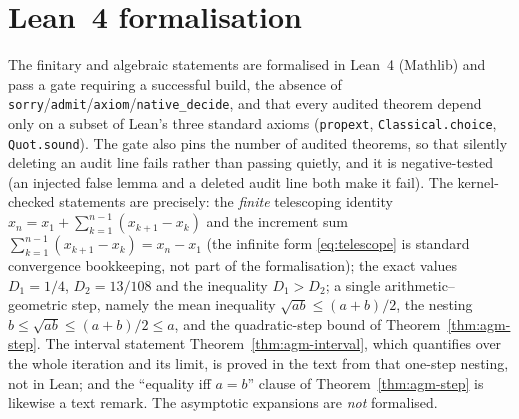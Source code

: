 \documentclass[11pt]{article}
\theoremstyle{plain}
\theoremstyle{remark}
\begin{document}
\section{Lean~4 formalisation}
\label{app:lean}
The finitary and algebraic statements are formalised in Lean~4 (Mathlib) and
pass a gate requiring a successful build, the absence of
\texttt{sorry}/\texttt{admit}/\texttt{axiom}/\texttt{native\_decide}, and that
every audited theorem depend only on a subset of Lean's three standard axioms
(\texttt{propext}, \texttt{Classical.choice}, \texttt{Quot.sound}). The gate
also pins the number of audited theorems, so that silently deleting an audit
line fails rather than passing quietly, and it is negative-tested (an injected
false lemma and a deleted audit line both make it fail). The kernel-checked
statements are precisely: the \emph{finite} telescoping identity
$x_n = x_1 + \sum_{k=1}^{n-1}(x_{k+1}-x_k)$ and the increment sum
$\sum_{k=1}^{n-1}(x_{k+1}-x_k) = x_n - x_1$ (the infinite form
\eqref{eq:telescope} is standard convergence bookkeeping, not part of the
formalisation); the exact values $D_1 = 1/4$, $D_2 = 13/108$ and the inequality
$D_1 > D_2$; a single arithmetic--geometric step, namely the mean inequality
$\sqrt{ab}\le(a+b)/2$, the nesting $b\le\sqrt{ab}\le(a+b)/2\le a$, and the
quadratic-step bound of Theorem~\ref{thm:agm-step}. The interval statement
Theorem~\ref{thm:agm-interval}, which quantifies over the whole iteration and
its limit, is proved in the text from that one-step nesting, not in Lean; and
the ``equality iff $a=b$'' clause of Theorem~\ref{thm:agm-step} is likewise a
text remark. The asymptotic expansions are \emph{not} formalised.
\end{document}
